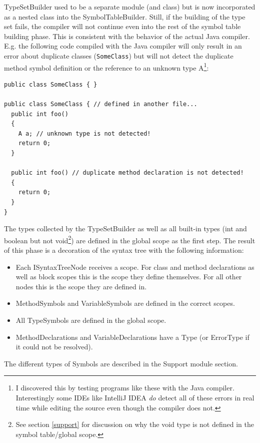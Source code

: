 \documentclass[a4paper,11pt]{article}
\begin{document}
TypeSetBuilder used to be a separate module (and class) but is now incorporated as a nested class into the SymbolTableBuilder. Still, if the building of the type set fails, the compiler will not continue even into the rest of the symbol table building phase. This is consistent with the behavior of the actual Java compiler. E.g. the following code compiled with the Java compiler will only result in an error about duplicate classes (\verb,SomeClass,) but will not detect the duplicate method symbol definition or the reference to an unknown type A\footnote{I discovered this by testing programs like these with the Java compiler. Interestingly some IDEs like IntelliJ IDEA \emph{do} detect all of these errors in real time while editing the source even though the compiler does not.}:
\begin{verbatim}
public class SomeClass { }

public class SomeClass { // defined in another file...
  public int foo()
  {
    A a; // unknown type is not detected!
    return 0;
  }

  public int foo() // duplicate method declaration is not detected!
  {
    return 0;
  }
}
\end{verbatim}

The types collected by the TypeSetBuilder as well as all built-in types (int and boolean but not void\footnote{See section \ref{support} for discussion on why the void type is not defined in the symbol table/global scope.}) are defined in the global scope as the first step. The result of this phase is a decoration of the syntax tree with the following information:

\begin{itemize}
    \item Each ISyntaxTreeNode receives a scope. For class and method declarations as well as block scopes this is the scope they define themselves. For all other nodes this is the scope they are defined in.
    \item MethodSymbols and VariableSymbols are defined in the correct scopes.
    \item All TypeSymbols are defined in the global scope.
    \item MethodDeclarations and VariableDeclarations have a Type (or ErrorType if it could not be resolved).
\end{itemize}

The different types of Symbols are described in the Support module section.
\end{document}
